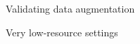 \documentclass[final]{beamer}
\newcommand{\mytable}{
    \centering
    \small
    \renewcommand{\arraystretch}{1.2}
    }
\begin{document}
\begin{frame}[t]
\begin{columns}[T]
\begin{column}{.33\linewidth}
\begin{minipage}[T]{.97\textwidth}
{\begin{block}{Validating data augmentation}
        

\end{block}

\begin{block}{Very low-resource settings}


\end{block}}
\end{minipage}
\end{column}
\end{columns}
\end{frame}
\end{document}
